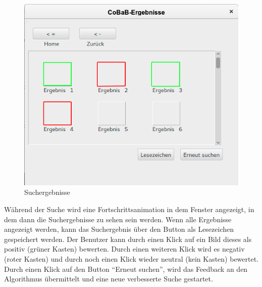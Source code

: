 \begin{figure}[H]
\includegraphics[width=1\linewidth]{img/Suchergebnisse2}
\caption{Suchergebnisse}
\label{fig:suchergebnisse}
\end{figure}
Während der Suche wird eine Fortschrittsanimation in dem Fenster angezeigt, in dem dann die Suchergebnisse zu sehen sein werden. Wenn alle Ergebnisse angezeigt werden, kann das Suchergebnis über den Button als Lesezeichen gespeichert werden.\newline 
Der Benutzer kann durch einen Klick auf ein Bild dieses als positiv (grüner Kasten) bewerten. Durch einen weiteren Klick wird es negativ (roter Kasten) und durch noch einen Klick wieder neutral (kein Kasten) bewertet. Durch einen Klick auf den Button \enquote{Erneut suchen}, wird das Feedback an den Algorithmus übermittelt und eine neue verbesserte Suche gestartet.
\pagebreak
